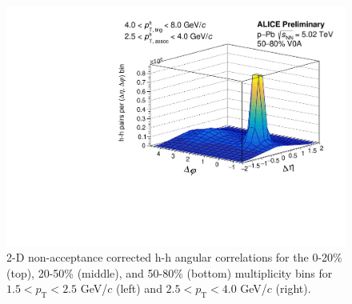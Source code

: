 \begin{figure}[ht]
\begin{minipage}{0.48\textwidth}
		\includegraphics[width=\textwidth]{figures/analysis/h_h_2d_nomixcor_fancy_label_50_80_highpt.pdf}
	\end{minipage}
	\caption{2-D non-acceptance corrected h-h angular correlations for the 0-20\% (top), 20-50\% (middle), and 50-80\% (bottom) multiplicity bins for $1.5 < p_{\text{T}} < 2.5$ GeV/$c$ (left) and $2.5 < p_{\text{T}} < 4.0$ GeV/$c$ (right).}
	\label{fig:h_h_2d_nomixcor}
\end{figure}

